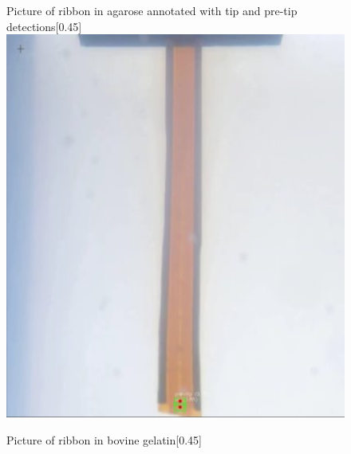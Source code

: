 \begin{figure}[htbp]
    \centering
    \begin{subcaptionbox}{Picture of ribbon in agarose annotated with tip and pre-tip detections\label{fig:left}}[0.45\linewidth]
        {\includegraphics[width=\linewidth]{images/RibbonPicture/agarose2.PNG}}
    \end{subcaptionbox}
    \hspace{0.05\linewidth}
    \begin{subcaptionbox}{Picture of ribbon in bovine gelatin\label{fig:right}}[0.45\linewidth]

\end{subcaptionbox}
\end{figure}
